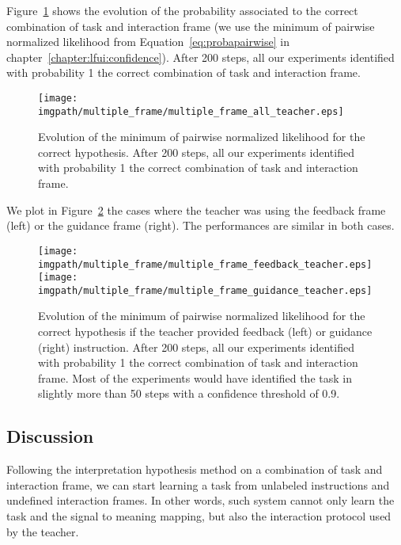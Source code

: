 Figure~\ref{fig:multipleframeall} shows the evolution of the probability associated to the correct combination of task and interaction frame (we use the minimum of pairwise normalized likelihood from Equation~\ref{eq:probapairwise} in chapter~\ref{chapter:lfui:confidence}). After 200 steps, all our experiments identified with probability 1 the correct combination of task and interaction frame. 


\begin{figure}[!htbp]
\centering
\texttt{[image: \\imgpath/multiple\_frame/multiple\_frame\_all\_teacher.eps]}
\caption{Evolution of the minimum of pairwise normalized likelihood for the correct hypothesis. After 200 steps, all our experiments identified with probability 1 the correct combination of task and interaction frame.}
\label{fig:multipleframeall}
\end{figure} 

We plot in Figure~\ref{fig:multipleframefeedbackvsguidance} the cases where the teacher was using the feedback frame (left) or the guidance frame (right). The performances are similar in both cases.

\begin{figure}[!htbp]
\centering
\texttt{[image: \\imgpath/multiple\_frame/multiple\_frame\_feedback\_teacher.eps]}
\texttt{[image: \\imgpath/multiple\_frame/multiple\_frame\_guidance\_teacher.eps]}
\caption{Evolution of the minimum of pairwise normalized likelihood for the correct hypothesis if the teacher provided feedback (left) or guidance (right) instruction. After 200 steps, all our experiments identified with probability 1 the correct combination of task and interaction frame. Most of the experiments would have identified the task in slightly more than 50 steps with a confidence threshold of 0.9.}
\label{fig:multipleframefeedbackvsguidance}
\end{figure}

\visuopti{\newpage}

\subsection{Discussion}

Following the interpretation hypothesis method on a combination of task and interaction frame, we can start learning a task from unlabeled instructions and undefined interaction frames. In other words, such system cannot only learn the task and the signal to meaning mapping, but also the interaction protocol used by the teacher.

